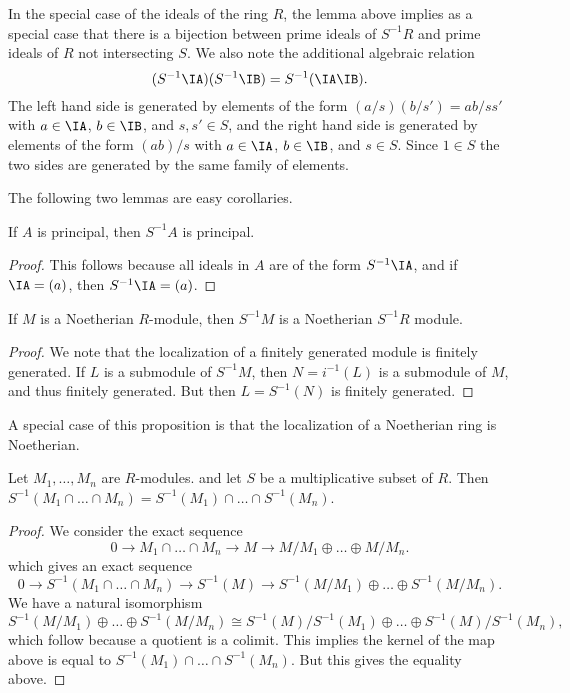 \begin{remark}
    In the special case of the ideals of the ring $R$, the lemma above implies as a special case that there is a bijection between prime ideals of $S^{-1}R$ and prime ideals of $R$ not intersecting $S$. We also note the additional algebraic relation
    \[ (S^{-1} \IA) (S^{-1} \IB) = S^{-1}(\IA \IB). \]
    The left hand side is generated by elements of the form $(a/s)(b/s') = ab/ss'$ with $a \in \IA$, $b \in \IB$, and $s,s' \in S$, and the right hand side is generated by elements of the form $(ab)/s$ with $a \in \IA$, $b \in \IB$, and $s \in S$. Since $1 \in S$ the two sides are generated by the same family of elements.
\end{remark}

The following two lemmas are easy corollaries.

\begin{prop}
    If $A$ is principal, then $S^{-1}A$ is principal.
\end{prop}
\begin{proof}
    This follows because all ideals in $A$ are of the form $S^{-1} \IA$, and if $\IA = (a)$, then $S^{-1}\IA = (a)$.
\end{proof}

\begin{prop}
    If $M$ is a Noetherian $R$-module, then $S^{-1}M$ is a Noetherian $S^{-1}R$ module.
\end{prop}
\begin{proof}
    We note that the localization of a finitely generated module is finitely generated. If $L$ is a submodule of $S^{-1}M$, then $N = i^{-1}(L)$ is a submodule of $M$, and thus finitely generated. But then $L = S^{-1}(N)$ is finitely generated.
\end{proof}

\begin{remark}
    A special case of this proposition is that the localization of a Noetherian ring is Noetherian.
\end{remark}

\begin{prop}
    Let $M_1,\dots, M_n$ are $R$-modules. and let $S$ be a multiplicative subset of $R$. Then $S^{-1}(M_1 \cap \dots \cap M_n) = S^{-1}(M_1) \cap \dots \cap S^{-1}(M_n)$.
\end{prop}
\begin{proof}
    We consider the exact sequence
    \[ 0 \to M_1 \cap \dots \cap M_n \to M \to M/M_1 \oplus \dots \oplus M/M_n. \]
    which gives an exact sequence
    \[ 0 \to S^{-1}(M_1 \cap \dots \cap M_n) \to S^{-1}(M) \to S^{-1}(M/M_1) \oplus \dots \oplus S^{-1}(M/M_n). \]
    We have a natural isomorphism
    \[ S^{-1}(M/M_1) \oplus \dots \oplus S^{-1}(M/M_n) \cong S^{-1}(M)/S^{-1}(M_1) \oplus \dots \oplus S^{-1}(M)/S^{-1}(M_n), \]
    which follow because a quotient is a colimit. This implies the kernel of the map above is equal to $S^{-1}(M_1) \cap \dots \cap S^{-1}(M_n)$. But this gives the equality above.
\end{proof}


